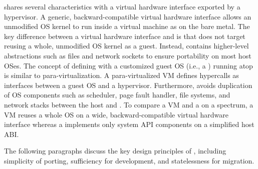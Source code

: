 \Thehostabi{} shares several characteristics with a virtual hardware interface
exported by a hypervisor.
A generic, backward-compatible
virtual hardware interface
allows an unmodified OS kernel to run inside a virtual machine as on the bare metal.
The key difference between
a virtual hardware interface
and \thehostabi{}
is that \thehostabi{} does not target reusing a whole, unmodified OS kernel as a guest.
Instead, 
\thehostabi{} contains higher-level abstractions such as files and network sockets
to ensure portability on most host OSes.
The concept
of defining \thehostabi{}
with a customized guest OS (i.e., a \libos{}) running atop \thehostabi{} is similar to para-virtualization.
A para-virtualized VM defines hypercalls as interfaces between a guest OS and a hypervisor.
Furthermore, \thehostabi{} avoids duplication of OS components
such as scheduler, page fault handler, file systems, and network stacks
between the host and \libos{}.
To compare a VM and a \libos{} on a spectrum,
a VM reuses a whole OS on a wide, backward-compatible virtual hardware interface
whereas a \libos{} implements only system API components on a simplified host ABI.

The following paragraphs discuss the key design principles of \thehostabi{},
including simplicity of porting, sufficiency for \libos{} development, and statelessness for migration.

